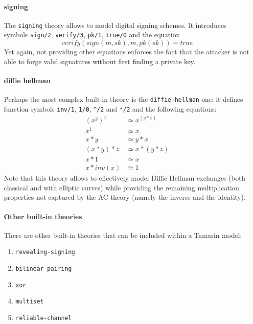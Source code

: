 \documentclass[fleqn,10pt]{SelfArx} %
\begin{document}
\paragraph{signing}
The \lstinline|signing| theory allows to model digital signing schemes. It introduces symbols \lstinline|sign/2|, \lstinline|verify/3|, \lstinline|pk/1|, \lstinline|true/0| and the equation
\begin{equation*}
    verify(sign(m,sk), m, pk(sk)) = true
\end{equation*}
Yet again, not providing other equations enforces the fact that the attacker is not able to forge valid signatures without first finding a private key.

\paragraph{diffie hellman}
Perhaps the most complex built-in theory is the \lstinline|diffie-hellman| one: it defines function symbols \lstinline|inv/1|, \lstinline|1/0|, \lstinline|^/2| and \lstinline|*/2| and the following equations:
\begin{align*}
    (x^y)^z  &\simeq x^{(y*z)}\\
    x^1      &\simeq x\\
    x*y      &\simeq y*x\\
    (x*y)*z  &\simeq x*(y*z)\\
    x*1      &\simeq x\\
    x*inv(x) &\simeq 1
\end{align*}
Note that this theory allows to effectively model Diffie Hellman exchanges (both classical and with elliptic curves) while providing the remaining multiplication properties not captured by the AC theory (namely the inverse and the identity).

\paragraph{Other built-in theories}
There are other built-in theories that can be included within a Tamarin model:

\begin{enumerate}
    \item \lstinline|revealing-signing|
    \item \lstinline|bilinear-pairing|
    \item \lstinline|xor|
    \item \lstinline|multiset|
    \item \lstinline|reliable-channel|
\end{enumerate}
\end{document}
